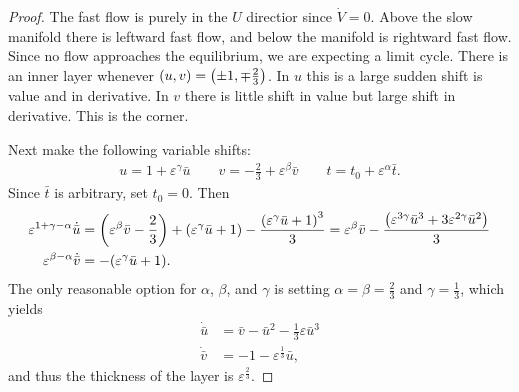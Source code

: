 \documentclass{article} %
\theoremstyle{plain}
\newcommand{\E}{\varepsilon}
\numberwithin{equation}{section} %
\numberwithin{figure}{section} %
\numberwithin{table}{section} %
\begin{document}
\begin{proof}
    The fast flow is purely in the $U$ directior since $\dot{V} = 0$.  Above the slow manifold there is leftward fast flow, and below the manifold is rightward fast flow.  Since no flow approaches the equilibrium, we are expecting a limit cycle.  There is an inner layer whenever $(u, v) = \qty(\pm 1, \mp \frac{2}{3})$.  In $u$ this is a large sudden shift is value and in derivative.  In $v$ there is little shift in value but large shift in derivative.  This is the corner.

    Next make the following variable shifts:
    \begin{align*}
        u = 1 + \E^\gamma \bar{u} \qquad v = -\frac{2}{3} + \E^\beta \bar{v} \qquad t = t_0 + \E^\alpha \bar{t}.
    \end{align*}
    Since $\bar{t}$ is arbitrary, set $t_0 = 0$.  Then
    \begin{align*}
        \E^{1 + \gamma - \alpha} \dot{\bar{u}} &= \qty(\E^\beta\bar{v} - \frac{2}{3}) + \qty(\E^\gamma\bar{u} + 1) - \frac{\qty(\E^\gamma\bar{u} + 1)^3}{3} = \E^\beta\bar{v} - \frac{\qty(\E^{3\gamma}\bar{u}^3 + 3\E^{2\gamma}\bar{u}^2)}{3} \\
        \E^{\beta - \alpha}\dot{\bar{v}} &= -(\E^\gamma\bar{u} + 1).
    \end{align*}
    The only reasonable option for $\alpha$, $\beta$, and $\gamma$ is setting $\alpha = \beta = \frac{2}{3}$ and $\gamma = \frac{1}{3}$, which yields
    \begin{align*}
        \dot{\bar{u}} &= \bar{v} -  \bar{u}^2 - \frac{1}{3}\E\bar{u}^3 \\
        \dot{\bar{v}} &= -1 - \E^{\frac{1}{3}} \bar{u},
    \end{align*}
    and thus the thickness of the layer is $\E^{\frac{2}{3}}$. \pagebreak
\end{proof}
    
\end{document}

